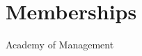 \documentclass[11pt,letterpaper]{report} %
\newcommand{\listitemspace}{0.25em}
\renewenvironment{itemize}
{\begin{list}{}{\setlength{\leftmargin}{0em}
                \setlength{\parskip}{0em}
                \setlength{\itemsep}{\listitemspace}
                \setlength{\parsep}{\listitemspace}}}
{\end{list}}
\begin{document}










    \section*{Memberships}

    \begin{itemize}

        \item Academy of Management

    \end{itemize}



\end{document}
